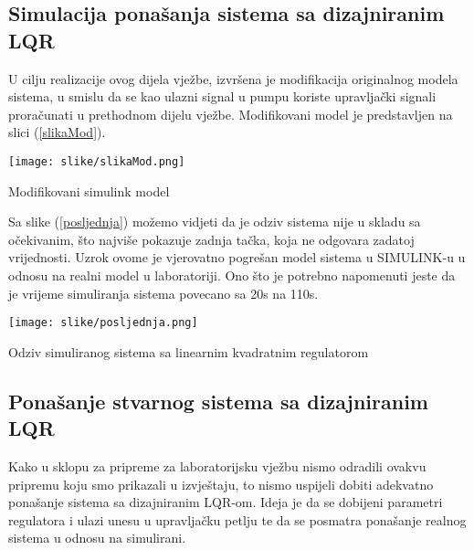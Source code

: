 \subsection{Simulacija ponašanja sistema sa dizajniranim LQR}
U cilju realizacije ovog dijela vježbe, izvršena je modifikacija originalnog
modela sistema, u smislu da se kao ulazni signal u pumpu koriste upravljački
signali proračunati u prethodnom dijelu vježbe. Modifikovani model je
predstavljen na slici (\ref{slikaMod}).

\begin{center}
    \captionsetup{type=figure}
    \begin{center}
        \texttt{[image: slike/slikaMod.png]}
        \caption{Modifikovani simulink model}
        \label{slikaMod}
    \end{center}
\end{center}

Sa slike (\ref{posljednja}) možemo vidjeti da je odziv sistema nije u skladu sa očekivanim, što najviše pokazuje zadnja tačka, koja ne odgovara zadatoj vrijednosti. Uzrok ovome je vjerovatno pogrešan model sistema u SIMULINK-u u odnosu na realni model u laboratoriji. Ono što je potrebno napomenuti jeste da je vrijeme simuliranja sistema povecano sa 20s na 110s.

\begin{center}
    \captionsetup{type=figure}
    \begin{center}
        \texttt{[image: slike/posljednja.png]}
        \caption{Odziv simuliranog sistema sa linearnim kvadratnim regulatorom}
        \label{posljednja}
    \end{center}
\end{center}

\subsection{Ponašanje stvarnog sistema sa dizajniranim LQR}
Kako u sklopu za pripreme za laboratorijsku vježbu nismo odradili ovakvu pripremu koju smo prikazali u izvještaju, to nismo uspijeli dobiti adekvatno ponašanje sistema sa dizajniranim LQR-om. Ideja je da se dobijeni parametri regulatora i ulazi unesu u upravljačku petlju te da se posmatra ponašanje realnog sistema u odnosu na simulirani.

















